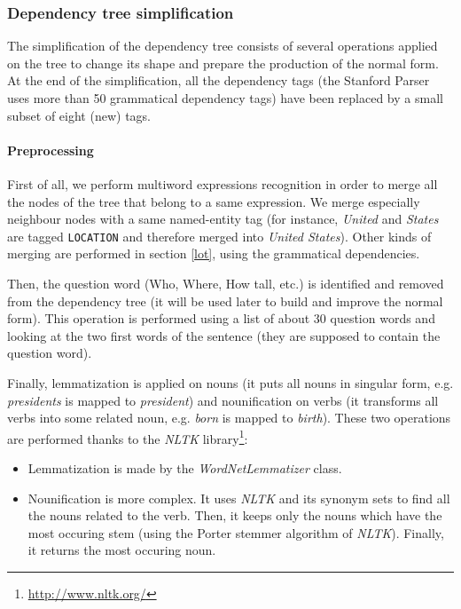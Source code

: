 
\subsubsection{Dependency tree simplification}
\label{dts}

The simplification of the dependency tree consists of several operations applied on the tree to change its shape and prepare the production of the normal form. At the end of the simplification, all the dependency tags (the Stanford Parser uses more than 50 grammatical dependency tags) have been replaced by a small subset of eight (new) tags.


\paragraph{Preprocessing}
\label{pre}

First of all, we perform multiword expressions recognition in order to merge all the nodes of the tree that belong to a same expression. We merge especially neighbour nodes with a same named-entity tag (for instance, \textit{United} and \textit{States} are tagged \texttt{LOCATION} and therefore merged into \textit{United States}). Other kinds of merging are performed in section \ref{lot}, using the grammatical dependencies.

Then, the question word (Who, Where, How tall, etc.) is identified and removed from the dependency tree (it will be used later to build and improve the normal form). This operation is performed using a list of about 30 question words and looking at the two first words of the sentence (they are supposed to contain the question word).

Finally, lemmatization is applied on nouns (it puts all nouns in singular form, e.g. \textit{presidents} is mapped to \textit{president}) and nounification on verbs (it transforms all verbs into some related noun, e.g. \textit{born} is mapped to \textit{birth}).
These two operations are performed thanks to the \emph{NLTK} library\footnote{\url{http://www.nltk.org/}}:
\begin{itemize}
    \item Lemmatization is made by the \emph{WordNetLemmatizer} class.
    \item Nounification is more complex. It uses \emph{NLTK} and its synonym sets to find all the nouns related to the verb. Then, it keeps only the nouns which have the most occuring stem (using the Porter stemmer algorithm of \emph{NLTK}). Finally, it returns the most occuring noun.
\end{itemize}

